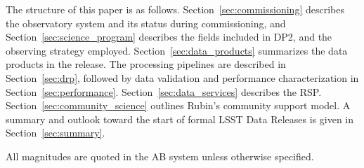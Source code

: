 The structure of this paper is as follows.
Section~\ref{sec:commissioning} describes the observatory system and its status during commissioning, and Section~\ref{sec:science_program} describes  the fields included in \gls{DP2}, and the observing strategy employed.
Section~\ref{sec:data_products} summarizes the data products in the release.
The processing pipelines are described in Section~\ref{sec:drp}, followed by data validation and performance characterization in Section~\ref{sec:performance}.
Section~\ref{sec:data_services} describes the \gls{RSP}.
Section~\ref{sec:community_science} outlines Rubin's community support model.
A summary and outlook toward the start of formal \gls{LSST} Data Releases is given in Section~\ref{sec:summary}.

All magnitudes are quoted in the AB system \citep[][]{1983ApJ...266..713O} unless otherwise specified.
